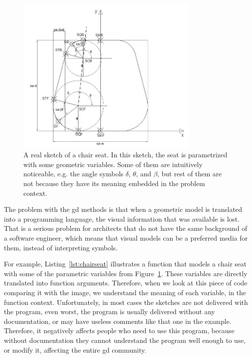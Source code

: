 \begin{figure}[!htbp]
  \centering
  \includegraphics[width=0.8\textwidth]{images/seat}
    \caption{A real sketch of a chair seat. In this sketch, the seat is parametrized with some geometric variables. Some of them are intuitively noticeable, e.g. the angle symbols $\delta$, $\theta$, and $\beta$, but rest of them are not because they have its meaning embedded in the problem context.}
  \label{fig:chairseat}
\end{figure}

The problem with the \gls{gd} methods is that when a geometric model is translated into a programming language, the visual information that was available is lost. That is a serious problem for architects that do not have the same background of a software engineer, which means that visual models can be a preferred media for them, instead of interpreting symbols. 



For example, Listing~\ref{lst:chairseat} illustrates a function that models a chair seat with some of the parametric variables from Figure~\ref{fig:chairseat}. These variables are directly translated into function arguments. Therefore, when we look at this piece of code comparing it with the image, we understand the meaning of each variable, in the function context. Unfortunately, in most cases the sketches are not delivered with the program, even worst, the program is usually delivered without any documentation, or may have useless comments like that one in the example. Therefore, it negatively affects people who need to use this program, because without documentation they cannot understand the program well enough to use, or modify it, affecting the entire \gls{gd} community. \\

